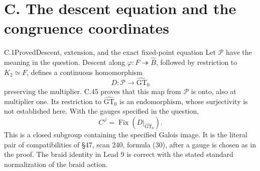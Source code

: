 \section{C. The descent equation and the congruence coordinates}

\begin{statement}{C.1}{Proved}{Descent, extension, and the exact fixed-point equation}
Let $\mathcal P$ have the meaning in the question. Descent along
$\varphi:F\twoheadrightarrow\widehat B$, followed by restriction to
$K_2\simeq F$, defines a continuous homomorphism
\[
 D:\mathcal P\longrightarrow\widehat{\mathrm{GT}}_0
\]
preserving the multiplier. C.45 proves that this map from $\mathcal P$
is onto, also at multiplier one. Its restriction to
$\widehat{\mathrm{GT}}_0$ is an endomorphism, whose surjectivity
is not established here. With the gauges specified
in the question,
\[
 C^\varphi=\operatorname{Fix}(D|_{\widehat{\mathrm{GT}}_0}).
\]
This is a closed subgroup containing the specified Galois image.
It is the literal pair of compatibilities of \S47, scan 240,
formula (30), after a gauge is chosen as in the proof.
The braid identity in Lead 9 is correct with the stated standard
normalization of the braid action.
\end{statement}
